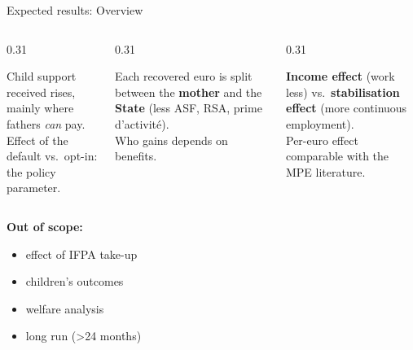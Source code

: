 \documentclass[aspectratio=169,10pt]{beamer}
\begin{document}
\begin{frame}{Expected results: Overview}
\vspace{0.6cm}
\footnotesize
\begin{columns}[T,onlytextwidth]
  \begin{column}{0.31\textwidth}
    \begin{keybox}[1. Payments]
      \raggedright
      Child support received rises, mainly where fathers \emph{can} pay.\\[0.15cm]
      {\color{textgrey}Effect of the default vs.\ opt-in: the policy parameter.}
    \end{keybox}
  \end{column}
  \begin{column}{0.31\textwidth}
    \begin{keybox}[2. Incidence]
      \raggedright
      Each recovered euro is split between the \textbf{mother} and the \textbf{State}
      (less ASF, RSA, prime d'activit\'e).\\[0.15cm]
      {\color{textgrey}Who gains depends on benefits.}
    \end{keybox}
  \end{column}
  \begin{column}{0.31\textwidth}
    \begin{keybox}
      \raggedright
      \textbf{Income effect} (work less) vs.\ \textbf{stabilisation effect}
      (more continuous employment).\\[0.15cm]
      {\color{textgrey}Per-euro effect comparable with the MPE literature.}
    \end{keybox}
  \end{column}
\end{columns}

\vspace{0.5cm}

\textbf{Out of scope:}
\begin{itemize}
  \item effect of IFPA take-up
  \item children's outcomes
  \item welfare analysis
  \item long run (>24 months)
\end{itemize}
\end{frame}
\end{document}
